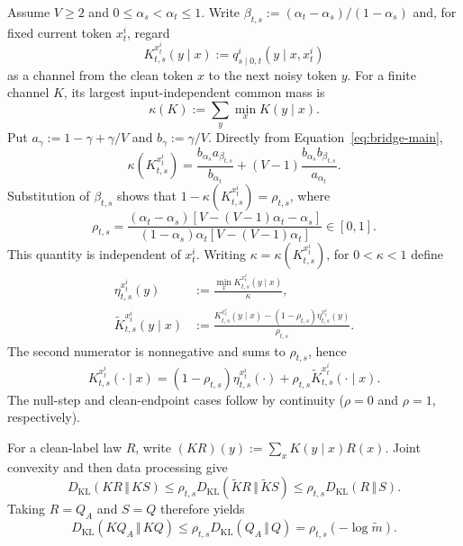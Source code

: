 \documentclass{article}
\newcommand{\KL}{D_{\mathrm{KL}}}
\newcommand{\kldiv}{\,\Vert\,}
\newcommand{\1}{\mathbf 1}
\theoremstyle{definition}
\begin{document}
Assume $V\ge2$ and $0\le\alpha_s<\alpha_t\le1$. Write
$\beta_{t,s}:=(\alpha_t-\alpha_s)/(1-\alpha_s)$ and, for fixed current token
$x_t^i$, regard
\[
 K_{t,s}^{x_t^i}(y\mid x)
 :=q_{s\mid0,t}^i(y\mid x,x_t^i)
\]
as a channel from the clean token $x$ to the next noisy token $y$. For a finite
channel $K$, its largest input-independent common mass is
\begin{equation}
 \kappa(K):=\sum_y\min_xK(y\mid x).
 \label{eq:common-mass-app}
\end{equation}
Put $a_\gamma:=1-\gamma+\gamma/V$ and $b_\gamma:=\gamma/V$. Directly from
Equation~\eqref{eq:bridge-main},
\begin{equation}
 \kappa(K_{t,s}^{x_t^i})
 =\frac{b_{\alpha_s}a_{\beta_{t,s}}}{b_{\alpha_t}}
 +(V-1)\frac{b_{\alpha_s}b_{\beta_{t,s}}}{a_{\alpha_t}}.
 \label{eq:uniform-common-mass-app}
\end{equation}
Substitution of $\beta_{t,s}$ shows that
$1-\kappa(K_{t,s}^{x_t^i})=\rho_{t,s}$, where
\begin{equation}
 \rho_{t,s}
 =\frac{(\alpha_t-\alpha_s)
 [V-(V-1)\alpha_t-\alpha_s]}
 {(1-\alpha_s)\alpha_t[V-(V-1)\alpha_t]}\in[0,1].
 \label{eq:rho-app}
\end{equation}
This quantity is independent of $x_t^i$. Writing
$\kappa=\kappa(K_{t,s}^{x_t^i})$, for $0<\kappa<1$ define
\begin{align}
 \eta_{t,s}^{x_t^i}(y)
 &:=\frac{\min_xK_{t,s}^{x_t^i}(y\mid x)}{\kappa},\nonumber\\
 \widetilde K_{t,s}^{x_t^i}(y\mid x)
 &:=\frac{K_{t,s}^{x_t^i}(y\mid x)
 -(1-\rho_{t,s})\eta_{t,s}^{x_t^i}(y)}{\rho_{t,s}}.
 \label{eq:uniform-bridge-mixture-parts-app}
\end{align}
The second numerator is nonnegative and sums to $\rho_{t,s}$, hence
\begin{equation}
 K_{t,s}^{x_t^i}(\cdot\mid x)
 =(1-\rho_{t,s})\eta_{t,s}^{x_t^i}(\cdot)
 +\rho_{t,s}\widetilde K_{t,s}^{x_t^i}(\cdot\mid x).
 \label{eq:uniform-bridge-mixture-app}
\end{equation}
The null-step and clean-endpoint cases follow by continuity
($\rho=0$ and $\rho=1$, respectively).

For a clean-label law $R$, write
$(KR)(y):=\sum_xK(y\mid x)R(x)$. Joint convexity and then data processing give
\[
 \KL(KR\kldiv KS)
 \le \rho_{t,s}\KL(\widetilde K R\kldiv\widetilde K S)
 \le \rho_{t,s}\KL(R\kldiv S).
\]
Taking $R=Q_A$ and $S=Q$ therefore yields
\begin{equation}
 \KL(KQ_A\kldiv KQ)\le \rho_{t,s}\KL(Q_A\kldiv Q)
 =\rho_{t,s}(-\log\widetilde m).
 \label{eq:bridge-contraction-app}
\end{equation}
\end{document}

